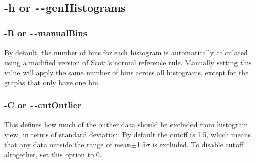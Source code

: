 \documentclass[letterpaper]{article}
\begin{document}
\subsection{\bf -h or \texttt{-{}-}genHistograms}
\subsubsection{\bf -B or \texttt{-{}-}manualBins}
By default, the number of bins for each histogram is automatically calculated using a modified version of Scott's normal reference rule. Manually setting this value will apply the same number of bins across all histograms, except for the graphs that only have one bin.
\subsubsection{\bf -C or \texttt{-{}-}cutOutlier}
This defines how much of the outlier data should be excluded from histogram view, in terms of standard deviation. By default the cutoff is 1.5, which means that any data outside the range of mean$\pm$1.5$\sigma$ is excluded. To disable cutoff altogether, set this option to 0.
\end{document}
